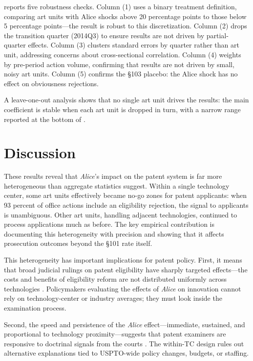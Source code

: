 \documentclass[12pt]{article}
\begin{document}
 reports five robustness checks. Column (1) uses a binary treatment definition, comparing art units with Alice shocks above 20 percentage points to those below 5 percentage points---the result is robust to this discretization. Column (2) drops the transition quarter (2014Q3) to ensure results are not driven by partial-quarter effects. Column (3) clusters standard errors by quarter rather than art unit, addressing concerns about cross-sectional correlation. Column (4) weights by pre-period action volume, confirming that results are not driven by small, noisy art units. Column (5) confirms the \S103 placebo: the Alice shock has no effect on obviousness rejections.

A leave-one-out analysis shows that no single art unit drives the results: the main coefficient is stable when each art unit is dropped in turn, with a narrow range reported at the bottom of .




\section{Discussion}

These results reveal that \textit{Alice}'s impact on the patent system is far more heterogeneous than aggregate statistics suggest. Within a single technology center, some art units effectively became no-go zones for patent applicants: when 93 percent of office actions include an eligibility rejection, the signal to applicants is unambiguous. Other art units, handling adjacent technologies, continued to process applications much as before. The key empirical contribution is documenting this heterogeneity with precision and showing that it affects prosecution outcomes beyond the \S101 rate itself.

This heterogeneity has important implications for patent policy. First, it means that broad judicial rulings on patent eligibility have sharply targeted effects---the costs and benefits of eligibility reform are not distributed uniformly across technologies \citep{lerner2009, boldrin2013}. Policymakers evaluating the effects of \textit{Alice} on innovation cannot rely on technology-center or industry averages; they must look inside the examination process.

Second, the speed and persistence of the \textit{Alice} effect---immediate, sustained, and proportional to technology proximity---suggests that patent examiners are responsive to doctrinal signals from the courts \citep{sampat2019}. The within-TC design rules out alternative explanations tied to USPTO-wide policy changes, budgets, or staffing.
\end{document}
